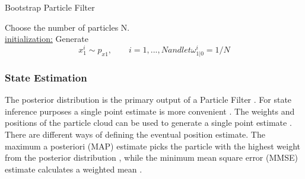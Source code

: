 \begin{algorithm}[H]
	\SetAlgoLined
	\caption{Bootstrap Particle Filter}
	\label{algo:rw-bootstrap_PF}
	Choose the number of particles N.\\
	\underline{initialization:}
	Generate 
	\begin{subequations}
		\begin{equation}
			x^i_1 \sim p_{x1}, \qquad i = 1,...,N
		\end{equation}
		and let
		\begin{equation}
		 \omega^i_{1|0} = 1/N
		\end{equation}
	\end{subequations}
	\;
\end{algorithm}


\subsubsection{State Estimation}

The posterior distribution is the primary output of a Particle Filter \cite{gustafsson2010particle}. For state inference purposes a single point estimate is more convenient \cite{Saha2009}. The weights and positions of the particle cloud can be used to generate a single point estimate \cite{gustafsson2010particle}. There are different ways of defining the eventual position estimate. The maximum a posteriori (MAP) estimate picks the particle with the highest weight from the posterior distribution \cite{Saha2009}, while the  minimum mean square error (MMSE) estimate calculates a weighted mean \cite{gustafsson2010particle,Saha2009}.\par 

